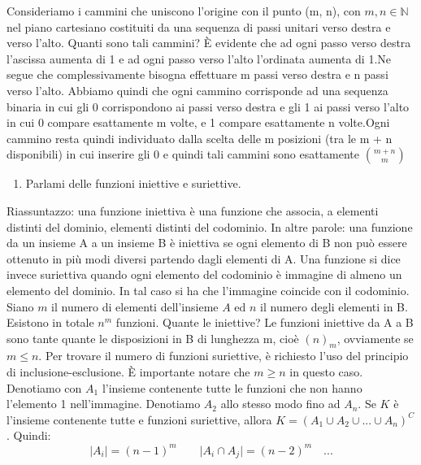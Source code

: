 Consideriamo i cammini che uniscono l’origine con il punto (m, n), con $m, n \in \mathbb{N}$ nel piano cartesiano costituiti da una sequenza di passi unitari verso destra e verso l'alto. Quanti sono tali cammini? È evidente che ad ogni passo verso destra l’ascissa aumenta di 1 e ad ogni passo verso l’alto l’ordinata aumenta di 1.\newline Ne segue che complessivamente bisogna effettuare m passi verso destra e n passi verso l'alto. Abbiamo quindi che ogni cammino corrisponde ad una sequenza binaria in cui gli 0 corrispondono ai passi verso destra e gli 1 ai passi verso l’alto in cui 0 compare esattamente m volte, e 1 compare esattamente n volte.\newline Ogni cammino resta quindi individuato dalla scelta delle m posizioni (tra le
m + n disponibili) in cui inserire gli 0 e quindi tali cammini sono esattamente $\binom {m + n}{m}$
\begin{enumerate}[resume]\bfseries
	\item Parlami delle funzioni iniettive e suriettive.
\end{enumerate}
Riassuntazzo:  una funzione iniettiva è una funzione che associa, a elementi distinti del dominio, elementi distinti del codominio.
In altre parole: una funzione da un insieme A a un insieme B è iniettiva se ogni elemento di B non può essere ottenuto in più modi diversi partendo dagli elementi di A.\newline
Una funzione si dice invece suriettiva quando ogni elemento del codominio è immagine di almeno un elemento del dominio. In tal caso si ha che l'immagine coincide con il codominio.
Siano $m$ il numero di elementi dell'insieme $A$ ed $n$ il numero degli elementi in B. Esistono in totale $n^m$ funzioni. Quante le iniettive?\newline
Le funzioni iniettive da A a B sono tante quante le disposizioni in B di lunghezza m, cioè $(n)_m$, ovviamente se $m \le n$.\newline
Per trovare il numero di funzioni suriettive, è richiesto l'uso del principio di inclusione-esclusione.\newline
È importante notare che $m \ge n$ in questo caso. \newline
Denotiamo con $A_1$ l'insieme contenente tutte le funzioni che non hanno l'elemento 1 nell'immagine. Denotiamo $A_2$ allo stesso modo fino ad $A_n$.
Se $K$ è l'insieme contenente tutte e funzioni suriettive, allora $K = (A_1 \cup A_2 \cup ... \cup A_n)^C$.\newline
Quindi:
 \[\vert A_i  \vert= (n-1)^m \quad \quad  \vert A_i \cap A_j  \vert= (n-2)^m \quad ...\]
